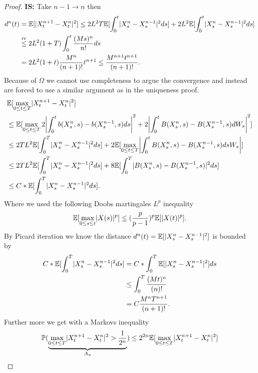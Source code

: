 \begin{proof}
  \textbf{IS:} Take $n-1 \to n$ then 
  \begin{align*}
    d^{n}(t) &= \E[\abs{X_t^{n+1} - X^{n}_t }^2] \le  2 L^2 T \E[\int_0^{t} \abs{X_s^{n} - X_s^{n-1}  }^2 ds ]  + 2L^2\E[\int_0^{t} \abs{X_s^{n} - X_s^{n-1}  }^2  ds] \\
             &\myS{IV}{\le } 2L^2(1+T) \int_0^{t} \frac{(Ms)^n}{n!} ds \\
             &= 2L^2(1+t) \frac{M^n}{(n+1)!} t^{n+1} \le \frac{M^{n+1}t^{n+1}}{(n+1)!} 
  .\end{align*}
  Because of $\Omega $ we cannot use completeness to argue the convergence and instead are forced to use a similar argument as in the uniqueness proof. 
  \begin{align*}
    &\E[\max_{0\le t \le T} \abs{X^{n+1}_t - X^{n}_t  }^2] \\
    &\le \E[\max_{0\le t\le T} 2\abs*{\int_0^{t} b(X_s^{n},s )-b(X_s^{n-1},s ) ds}^2 + 2\abs*{\int_0^{t}B(X_s^{n},s )-B(X_s^{n-1},s ) dW_s}^2] \\
    &\le 2TL^2 \E[\int_0^{T} \abs{X_s^{n} - X_s^{n-1}  }^2 ds ] + 2\E[\max_{0\le t\le T} \abs*{\int_0^{t} B(X_s^{n},s )- B(X_s^{n-1},s ) ds W_s}]\\
    &\le  2TL^2 \E[\int_0^{T} \abs{X_s^{n} - X_s^{n-1}  }^2 ds ] + 8\E[\int_0^{T} \abs{B(X_s^{n},s  )-B(X_s^{n-1},s )}^2 ds ]\\
    &\le C*\E[\int_0^{T} \abs{X_s^{n}-X_s^{n-1}  }^2 ds ]
  .\end{align*}
  Where we used the following Doobs martingales $L^{p}$ inequality 
  \begin{align*}
    \mathbb{E}[\max_{0\le s\le t} \lvert X(s)\rvert^{p} ] \le  (\frac{p}{p-1})^{p} \mathbb{E}[\lvert X(t)\rvert^{p}  ] 
  .\end{align*}
  By Picard iteration we know the distance $d^{n}(t) = \mathbb{E}[\lvert X_s^{n}-X_s^{n-1}  \rvert^2] $ is bounded by 
  \begin{align*}
    C*\mathbb{E}[\int_0^{T} \lvert X_s^{n}-X_s^{n-1}  \rvert^2 ds ] &= C* \int_0^{T} \mathbb{E}[\lvert X_s^{n} - X_s^{n-1}  \rvert^2] ds \\
                                                     &\le \int_0^{T} \frac{(Mt)^{n} }{(n)!} \\
                                                     &= C \frac{M^{n} T^{n+1} }{(n+1)!}
  .\end{align*}
  Further more we get with a Markovs inequality
  \begin{align*}
    \P(\underbrace{\max_{0\le t\le T} \abs{X_t^{n+1}-X_t^n}^2 > \frac{1}{2^{n} }}_{A_n}) &\le 2^{2n} \E[\max_{0\le t\le T} \abs{X_t^{n+1}-X_t^n}^2]\\

\end{align*}
\end{proof}
